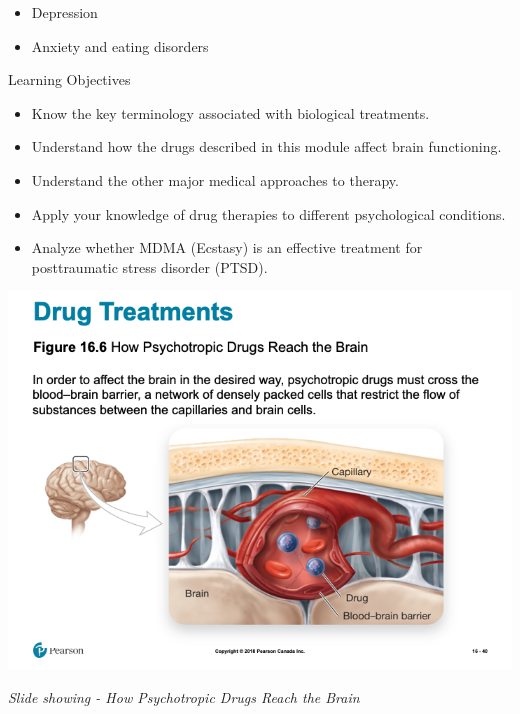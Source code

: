 \documentclass[
]{book}
\providecommand{\tightlist}{%
  \setlength{\itemsep}{0pt}\setlength{\parskip}{0pt}}
\begin{document}
\begin{reflect}
\begin{itemize}
  \begin{itemize}
  \tightlist
  \item
    Depression\\
  \item
    Anxiety and eating disorders
  \end{itemize}
\end{itemize}

Learning Objectives

\begin{itemize}
\tightlist
\item
  Know the key terminology associated with biological treatments.\\
\item
  Understand how the drugs described in this module affect brain functioning.\\
\item
  Understand the other major medical approaches to therapy.\\
\item
  Apply your knowledge of drug therapies to different psychological conditions.\\
\item
  Analyze whether MDMA (Ecstasy) is an effective treatment for posttraumatic stress disorder (PTSD).
\end{itemize}

\includegraphics{assets/unit_11/slide_40.png}

\emph{Slide showing - How Psychotropic Drugs Reach the Brain}


\end{reflect}
\end{document}
